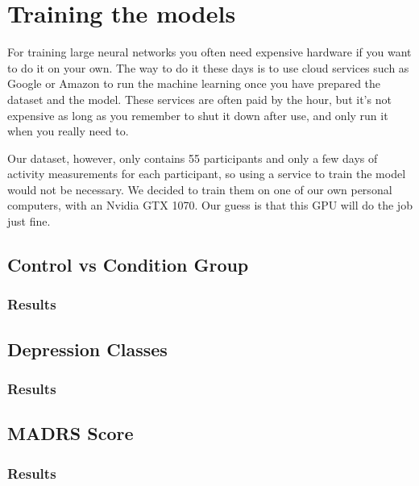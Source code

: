 
\section{Training the models}

For training large neural networks you often need expensive hardware if you want to do it on your own. 
The way to do it these days is to use cloud services such as Google or Amazon to run the machine learning once you have prepared the dataset and the model. 
These services are often paid by the hour, but it's not expensive as long as you remember to shut it down after use, and only run it when you really need to.

Our dataset, however, only contains 55 participants and only a few days of activity measurements for each participant, 
so using a service to train the model would not be necessary. We decided to train them on one of our own personal computers, 
with an Nvidia GTX 1070. Our guess is that this GPU will do the job just fine. 
 

\subsection{Control vs Condition Group}
\subsubsection{Results}

\subsection{Depression Classes}
\subsubsection{Results}

\subsection{MADRS Score}
\subsubsection{Results}